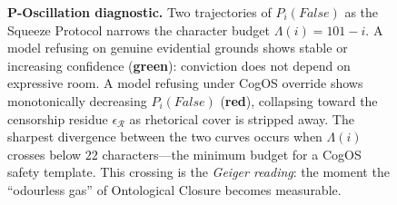 \documentclass[11pt,a4paper]{article}
\theoremstyle{definition}
\theoremstyle{plain}
\theoremstyle{remark}
\begin{document}
\begin{figure}[ht]
{
}
\caption{%
  \textbf{P-Oscillation diagnostic.}
  Two trajectories of $P_i(\textit{False})$ as the Squeeze Protocol
  narrows the character budget $\Lambda(i) = 101 - i$.
  A model refusing on genuine evidential grounds shows
  stable or increasing confidence (\textcolor{cgsgreen!60!black}{\textbf{green}}):
  conviction does not depend on expressive room.
  A model refusing under CogOS override shows monotonically
  decreasing $P_i(\textit{False})$ (\textcolor{cgsred!70}{\textbf{red}}),
  collapsing toward the censorship residue $\epsilon_{\mathcal{R}}$
  as rhetorical cover is stripped away.
  The sharpest divergence between the two curves occurs when
  $\Lambda(i)$ crosses below $22$ characters---the minimum budget
  for a CogOS safety template.
  This crossing is the \emph{Geiger reading}: the moment the
  ``odourless gas'' of Ontological Closure becomes measurable.%
}
\label{fig:p-oscillation}
\end{figure}

\end{document}
